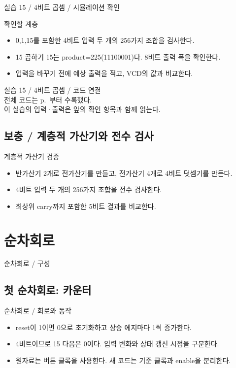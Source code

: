 \documentclass[aspectratio=169,11pt]{beamer}
\newcommand{\chaptercontents}[2]{%
  \begin{frame}[t]{#2}
    \tableofcontents[sections={#1},sectionstyle=show/show,subsectionstyle=show/show/show]
  \end{frame}}
\newcommand{\sourceref}[1]{}
\newcommand{\checkpage}[4]{%
  \begin{frame}[t]{#1 / 시뮬레이션 확인}
    \small
    \begin{block}{확인할 계층}
      \texttt{\detokenize{#2}}
    \end{block}
    \begin{itemize}
      \item #3
      \item #4
      \item 입력을 바꾸기 전에 예상 출력을 적고, VCD의 값과 비교한다.
    \end{itemize}
  \end{frame}}
\begin{document}
\checkpage{실습 15 / 4비트 곱셈}{tb_legacy.dut.u_comb}{0,1,15를 포함한 4비트 입력 두 개의 256가지 조합을 검사한다.}{15 곱하기 15는 product=225(11100001)다. 8비트 출력 폭을 확인한다.}
\begin{frame}{실습 15 / 4비트 곱셈 / 코드 연결}
\small\texttt{}\\[0.4cm]
전체 코드는 p.~\pageref{code:src/combinational/lab_combinational.v}부터 수록했다.\\[0.3cm]
이 실습의 입력·출력은 앞의 확인 항목과 함께 읽는다.
\end{frame}
\subsection{보충 / 계층적 가산기와 전수 검사}
\begin{frame}{계층적 가산기 검증}
\begin{itemize}
\item 반가산기 2개로 전가산기를 만들고, 전가산기 4개로 4비트 덧셈기를 만든다.
\item 4비트 입력 두 개의 256가지 조합을 전수 검사한다.
\item 최상위 carry까지 포함한 5비트 결과를 비교한다.
\end{itemize}
\end{frame}
\section{순차회로}
\chaptercontents{2}{순차회로 / 구성}
\subsection{첫 순차회로: 카운터}
\begin{frame}[t]{순차회로 / 회로와 동작}
\small
\begin{center}\end{center}\begin{itemize}\setlength{\itemsep}{0.5em}\item reset이 1이면 0으로 초기화하고 상승 에지마다 1씩 증가한다.
\item 4비트이므로 15 다음은 0이다. 입력 변화와 상태 갱신 시점을 구분한다.
\item 원자료는 버튼 클록을 사용한다. 새 코드는 기준 클록과 enable을 분리한다.\end{itemize}
\sourceref{2.1\_처음 실습하기, p.3, 4}
\end{frame}
\end{document}

